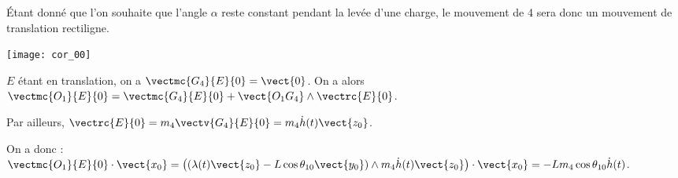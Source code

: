 \ifprof
\begin{corrige}
Étant donné que l'on souhaite que l'angle $\alpha$ reste constant pendant la levée d'une charge, le mouvement de 4 sera donc un mouvement de translation rectiligne.  

\begin{center}
\texttt{[image: cor\_00]}
\end{center}
\end{corrige}
\else
\fi



\ifprof
\begin{corrige}
$E$ étant en translation, on a $\vectmc{G_4}{E}{0}=\vect{0}$. On a alors 
 $\vectmc{O_1}{E}{0}=\vectmc{G_4}{E}{0}+\vect{O_1G_4}\wedge\vectrc{E}{0}$.

Par ailleurs, $\vectrc{E}{0}=m_4\vectv{G_4}{E}{0} = m_4\dot{h}(t)\vect{z_0}$. 

On a donc :
$ \vectmc{O_1}{E}{0}\cdot \vect{x_0} 
= \left(\left( \lambda(t)\vect{z_0}-L\cos\theta_{10}\vect{y_0}\right)\wedge m_4\dot{h}(t)\vect{z_0}\right) \cdot \vect{x_0}
=  -Lm_4\cos\theta_{10}\dot{h}(t)$.
 
 
\end{corrige}
\else
\fi





